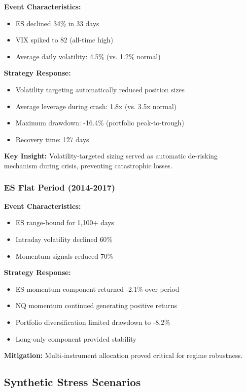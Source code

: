 \documentclass[twocolumn,ieee]{arithmaxresearch}
\begin{document}
\textbf{Event Characteristics:}
\begin{itemize}
    \item ES declined 34\% in 33 days
    \item VIX spiked to 82 (all-time high)
    \item Average daily volatility: 4.5\% (vs. 1.2\% normal)
\end{itemize}

\textbf{Strategy Response:}
\begin{itemize}
    \item Volatility targeting automatically reduced position sizes
    \item Average leverage during crash: 1.8x (vs. 3.5x normal)
    \item Maximum drawdown: -16.4\% (portfolio peak-to-trough)
    \item Recovery time: 127 days
\end{itemize}

\textbf{Key Insight:} Volatility-targeted sizing served as automatic de-risking mechanism during crisis, preventing catastrophic losses.

\subsubsection{ES Flat Period (2014-2017)}

\textbf{Event Characteristics:}
\begin{itemize}
    \item ES range-bound for 1,100+ days
    \item Intraday volatility declined 60\%
    \item Momentum signals reduced 70\%
\end{itemize}

\textbf{Strategy Response:}
\begin{itemize}
    \item ES momentum component returned -2.1\% over period
    \item NQ momentum continued generating positive returns
    \item Portfolio diversification limited drawdown to -8.2\%
    \item Long-only component provided stability
\end{itemize}

\textbf{Mitigation:} Multi-instrument allocation proved critical for regime robustness.

\subsection{Synthetic Stress Scenarios}
\end{document}
